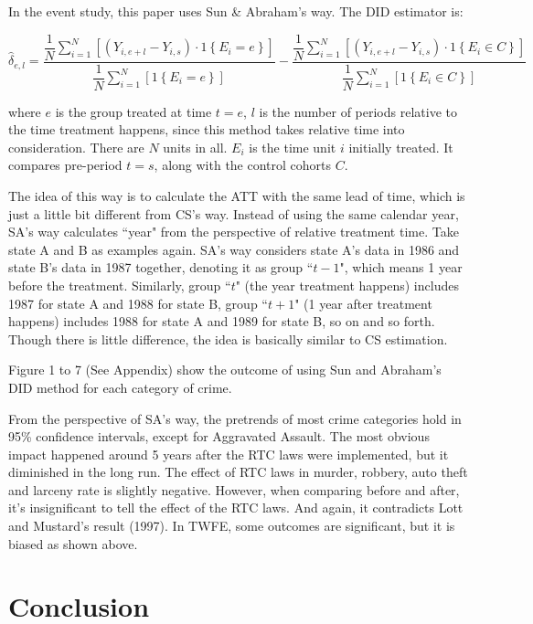 \documentclass{article}
\begin{document}
In the event study, this paper uses Sun \& Abraham's way. The DID estimator is:

$$
    \hat{\delta}_{e,l} = \dfrac{\dfrac{1}{N}\sum\limits^{N}_{i=1}\left[\left(Y_{i,e+l}-Y_{i,s}\right)\cdot1\left\{E_{i}=e\right\}\right]}{\dfrac{1}{N}\sum\limits^{N}_{i=1}\left[1\left\{E_{i}=e\right\}\right]}-\dfrac{\dfrac{1}{N}\sum\limits^{N}_{i=1}\left[\left(Y_{i,e+l}-Y_{i,s}\right)\cdot1\left\{E_{i}\in C\right\}\right]}{\dfrac{1}{N}\sum\limits^{N}_{i=1}\left[1\left\{E_{i}\in C\right\}\right]}
$$

where $e$ is the group treated at time $t=e$, $l$ is the number of periods relative to the time treatment happens, since this method takes relative time into consideration. There are $N$ units in all. $E_{i}$ is the time unit $i$ initially treated. It compares pre-period $t=s$, along with the control cohorts $C$.

\newpage

The idea of this way is to calculate the ATT with the same lead of time, which is just a little bit different from CS's way. Instead of using the same calendar year, SA's way calculates ``year" from the perspective of relative treatment time. Take state A and B as examples again. SA's way considers state A's data in 1986 and state B's data in 1987 together, denoting it as group ``$t-1$", which means 1 year before the treatment. Similarly, group ``$t$" (the year treatment happens) includes 1987 for state A and 1988 for state B, group ``$t+1$" (1 year after treatment happens) includes 1988 for state A and 1989 for state B, so on and so forth. Though there is little difference, the idea is basically similar to CS estimation.

Figure 1 to 7 (See Appendix) show the outcome of using Sun and Abraham's DID method for each category of crime. 

From the perspective of SA's way, the pretrends of most crime categories hold in 95\% confidence intervals, except for Aggravated Assault. The most obvious impact happened around 5 years after the RTC laws were implemented, but it diminished in the long run. The effect of RTC laws in murder, robbery, auto theft and larceny rate is slightly negative. However, when comparing before and after, it's insignificant to tell the effect of the RTC laws. And again, it contradicts Lott and Mustard's result (1997). In TWFE, some outcomes are significant, but it is biased as shown above. 

\section{Conclusion}
\end{document}
